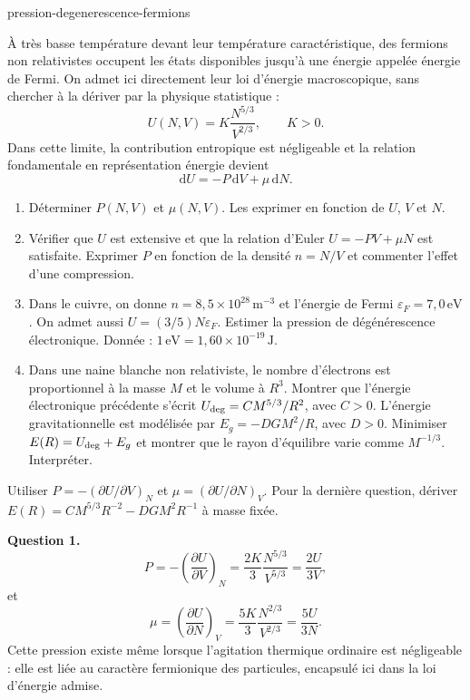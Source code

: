 \begin{exo}{pression-degenerescence-fermions}

À très basse température devant leur température caractéristique, des fermions non relativistes occupent les états disponibles jusqu'à une énergie appelée énergie de Fermi. On admet ici directement leur loi d'énergie macroscopique, sans chercher à la dériver par la physique statistique :
\[
U(N,V)=K\frac{N^{5/3}}{V^{2/3}},
\qquad K>0.
\]
Dans cette limite, la contribution entropique est négligeable et la relation fondamentale en représentation énergie devient
\[
\mathrm dU=-P\,\mathrm dV+\mu\,\mathrm dN.
\]

\begin{enumerate}
\item Déterminer $P(N,V)$ et $\mu(N,V)$. Les exprimer en fonction de $U$, $V$ et $N$.
\item Vérifier que $U$ est extensive et que la relation d'Euler $U=-PV+\mu N$ est satisfaite. Exprimer $P$ en fonction de la densité $n=N/V$ et commenter l'effet d'une compression.
\item Dans le cuivre, on donne $n=8{,}5\times10^{28}\,\mathrm{m}^{-3}$ et l'énergie de Fermi $\varepsilon_F=7{,}0\,\mathrm{eV}$. On admet aussi $U=(3/5)N\varepsilon_F$. Estimer la pression de dégénérescence électronique. Donnée : $1\,\mathrm{eV}=1{,}60\times10^{-19}\,\mathrm J$.
\item Dans une naine blanche non relativiste, le nombre d'électrons est proportionnel à la masse $M$ et le volume à $R^3$. Montrer que l'énergie électronique précédente s'écrit $U_{\rm deg}=C M^{5/3}/R^2$, avec $C>0$. L'énergie gravitationnelle est modélisée par $E_g=-DGM^2/R$, avec $D>0$. Minimiser $E(R)=U_{\rm deg}+E_g$ et montrer que le rayon d'équilibre varie comme $M^{-1/3}$. Interpréter.
\end{enumerate}

\begin{indication}
Utiliser $P=-(\partial U/\partial V)_N$ et $\mu=(\partial U/\partial N)_V$. Pour la dernière question, dériver $E(R)=CM^{5/3}R^{-2}-DGM^2R^{-1}$ à masse fixée.
\end{indication}

\begin{solution}
\textbf{Question 1.}
\[
P=-\left(\frac{\partial U}{\partial V}\right)_N
=\frac{2K}{3}\frac{N^{5/3}}{V^{5/3}}
=\boxed{\frac{2U}{3V}},
\]
et
\[
\mu=\left(\frac{\partial U}{\partial N}\right)_V
=\frac{5K}{3}\frac{N^{2/3}}{V^{2/3}}
=\boxed{\frac{5U}{3N}}.
\]
Cette pression existe même lorsque l'agitation thermique ordinaire est négligeable : elle est liée au caractère fermionique des particules, encapsulé ici dans la loi d'énergie admise.


\end{solution}
\end{exo}
